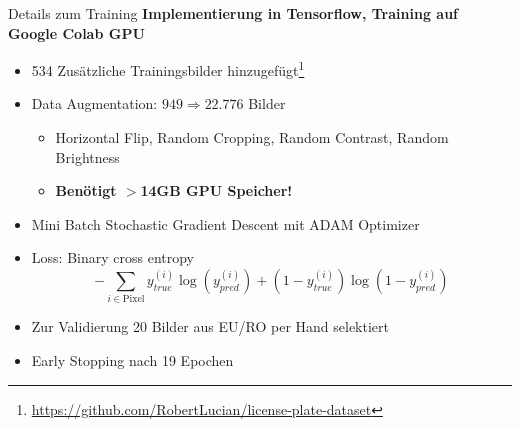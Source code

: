 \begin{frame}{Details zum Training}
    \textbf{Implementierung in Tensorflow, Training auf Google Colab GPU}
    \begin{itemize}
        \item 534 Zus\"atzliche Trainingsbilder hinzugef\"ugt\footnote{\url{https://github.com/RobertLucian/license-plate-dataset}}
        \item Data Augmentation: $949 \Rightarrow 22.776$ Bilder
              \begin{itemize}
                  \item Horizontal Flip, Random Cropping, Random Contrast, Random Brightness
                  \item \textbf{Ben\"otigt $>$14GB GPU Speicher!}
              \end{itemize}
        \item Mini Batch Stochastic Gradient Descent mit ADAM Optimizer
        \item Loss: Binary cross entropy
              \begin{equation*}
                  -\sum_{i \in \text{Pixel}} y_{true}^{(i)} \log (y_{pred}^{(i)}) + (1 - y_{true}^{(i)}) \log (1 - y_{pred}^{(i)})
              \end{equation*}
        \item Zur Validierung 20 Bilder aus EU/RO per Hand selektiert
        \item \glqq Early Stopping\grqq{} nach 19 Epochen
    \end{itemize}
\end{frame}

